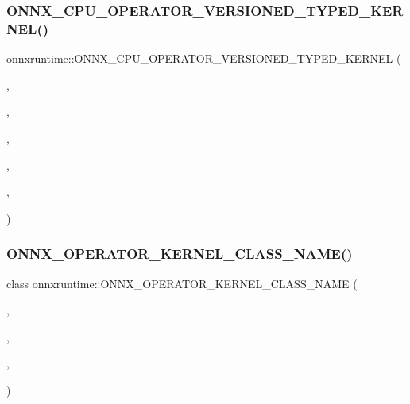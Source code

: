 \subsubsection{\texorpdfstring{O\+N\+N\+X\+\_\+\+C\+P\+U\+\_\+\+O\+P\+E\+R\+A\+T\+O\+R\+\_\+\+V\+E\+R\+S\+I\+O\+N\+E\+D\+\_\+\+T\+Y\+P\+E\+D\+\_\+\+K\+E\+R\+N\+E\+L()}{ONNX\_CPU\_OPERATOR\_VERSIONED\_TYPED\_KERNEL()}\hspace{0.1cm}{\footnotesize\ttfamily [2/2]}}
{\footnotesize\ttfamily onnxruntime\+::\+O\+N\+N\+X\+\_\+\+C\+P\+U\+\_\+\+O\+P\+E\+R\+A\+T\+O\+R\+\_\+\+V\+E\+R\+S\+I\+O\+N\+E\+D\+\_\+\+T\+Y\+P\+E\+D\+\_\+\+K\+E\+R\+N\+EL (\begin{DoxyParamCaption}\item[{\mbox{\hyperlink{classonnxruntime_1_1Greater}{Greater}}}]{,  }\item[{7}]{,  }\item[{9}]{,  }\item[{float}]{,  }\item[{\mbox{\hyperlink{classonnxruntime_1_1KernelDefBuilder}{Kernel\+Def\+Builder}}().Type\+Constraint(\char`\"{}T\char`\"{}, Data\+Type\+Impl\+::\+Get\+Tensor\+Type$<$ float $>$())}]{,  }\item[{\mbox{\hyperlink{classonnxruntime_1_1Greater}{Greater}}$<$ float $>$}]{ }\end{DoxyParamCaption})}

\mbox{\label{namespaceonnxruntime_a51a6eab5251ddfefe495ca83839c9488}} 
\subsubsection{\texorpdfstring{O\+N\+N\+X\+\_\+\+O\+P\+E\+R\+A\+T\+O\+R\+\_\+\+K\+E\+R\+N\+E\+L\+\_\+\+C\+L\+A\+S\+S\+\_\+\+N\+A\+M\+E()}{ONNX\_OPERATOR\_KERNEL\_CLASS\_NAME()}\hspace{0.1cm}{\footnotesize\ttfamily [1/83]}}
{\footnotesize\ttfamily class onnxruntime\+::\+O\+N\+N\+X\+\_\+\+O\+P\+E\+R\+A\+T\+O\+R\+\_\+\+K\+E\+R\+N\+E\+L\+\_\+\+C\+L\+A\+S\+S\+\_\+\+N\+A\+ME (\begin{DoxyParamCaption}\item[{\mbox{\hyperlink{namespaceonnxruntime_a394a3c7e50622de1f203a96df592060d}{k\+Cpu\+Execution\+Provider}}}]{,  }\item[{\mbox{\hyperlink{namespaceonnxruntime_ac0e7c0c106a2c9e9594560a3ab289fa0}{k\+Onnx\+Domain}}}]{,  }\item[{1}]{,  }\item[{\mbox{\hyperlink{structonnxruntime_1_1Slice}{Slice}}}]{ }\end{DoxyParamCaption})}

